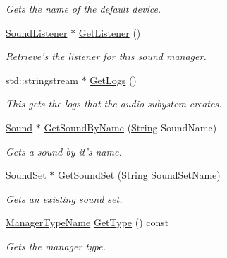 \begin{DoxyCompactItemize}
\begin{DoxyCompactList}\small\item\em Gets the name of the default device. \item\end{DoxyCompactList}\item 
\hyperlink{classphys_1_1SoundListener}{SoundListener} $\ast$ \hyperlink{classphys_1_1SoundManager_af0c700e283c44c20466185e1150fc6a3}{GetListener} ()
\begin{DoxyCompactList}\small\item\em Retrieve's the listener for this sound manager. \item\end{DoxyCompactList}\item 
std::stringstream $\ast$ \hyperlink{classphys_1_1SoundManager_a284fbc2fdbecdf66e717366b09e2c9da}{GetLogs} ()
\begin{DoxyCompactList}\small\item\em This gets the logs that the audio subystem creates. \item\end{DoxyCompactList}\item 
\hyperlink{classphys_1_1Sound}{Sound} $\ast$ \hyperlink{classphys_1_1SoundManager_aa325440a688757ad74812b7f093e2423}{GetSoundByName} (\hyperlink{namespacephys_aa03900411993de7fbfec4789bc1d392e}{String} SoundName)
\begin{DoxyCompactList}\small\item\em Gets a sound by it's name. \item\end{DoxyCompactList}\item 
\hyperlink{classphys_1_1SoundSet}{SoundSet} $\ast$ \hyperlink{classphys_1_1SoundManager_a419edd2aed481ed7eff4beb11c9a6cf2}{GetSoundSet} (\hyperlink{namespacephys_aa03900411993de7fbfec4789bc1d392e}{String} SoundSetName)
\begin{DoxyCompactList}\small\item\em Gets an existing sound set. \item\end{DoxyCompactList}\item 
\hyperlink{classphys_1_1ManagerBase_aaa6ccddf23892eaccb898529414f80a5}{ManagerTypeName} \hyperlink{classphys_1_1SoundManager_a6815f78a6170b119e2d1d24e862ffbf8}{GetType} () const 
\begin{DoxyCompactList}\small\item\em Gets the manager type. \item\end{DoxyCompactList}\item 

\end{DoxyCompactItemize}
